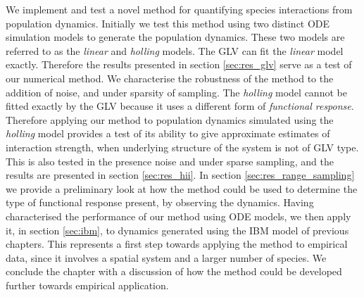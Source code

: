 We implement and test a novel method for quantifying species interactions from population dynamics. Initially we test this method using two distinct ODE simulation models to generate the population dynamics. These two models are referred to as the \emph{linear} and \emph{holling} models. The GLV can fit the \emph{linear} model exactly. Therefore the results presented in section \ref{sec:res_glv} serve as a test of our numerical method. We characterise the robustness of the method to the addition of noise, and under sparsity of sampling. The \emph{holling} model cannot be fitted exactly by the GLV because it uses a different form of \emph{functional response}. Therefore applying our method to population dynamics simulated using the \emph{holling} model provides a test of its ability to give approximate estimates of interaction strength, when underlying structure of the system is not of GLV type. This is also tested in the presence noise and under sparse sampling, and the results are presented in section \ref{sec:res_hii}. In section \ref{sec:res_range_sampling} we provide a preliminary look at how the method could be used to determine the type of functional response present, by observing the dynamics. Having characterised the performance of our method using ODE models, we then apply it, in section \ref{sec:ibm}, to dynamics generated using the IBM model of previous chapters. This represents a first step towards applying the method to empirical data, since it involves a spatial system and a larger number of species. We conclude the chapter with a discussion of how the method could be developed further towards empirical application. 

%
%

